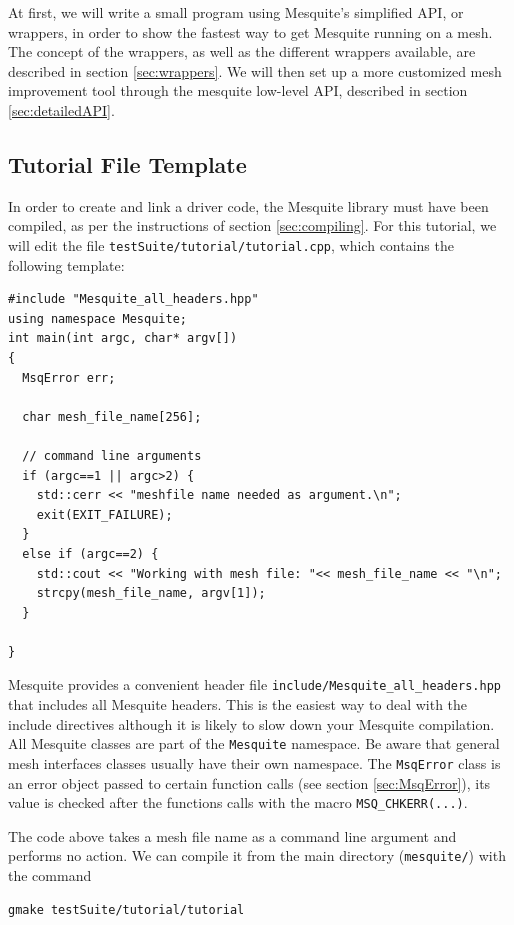 \documentclass[letter]{report}
\begin{document}
At first, we will write a small program using Mesquite's simplified API, or wrappers, in order to show the
fastest way to get Mesquite running on a mesh. The concept of the wrappers, as well as the different
wrappers available, are described in section \ref{sec:wrappers}. We will then set up a more customized mesh
improvement tool through the mesquite low-level API, described in section \ref{sec:detailedAPI}.

\subsection{Tutorial File Template}
\label{sec:tutfile}

In order to create and link a driver code, the Mesquite library must have been compiled, as per the
instructions of section \ref{sec:compiling}. For this tutorial, we will edit the file
\texttt{testSuite/tutorial/tutorial.cpp}, which contains the following template:
\begin{verbatim}
#include "Mesquite_all_headers.hpp"
using namespace Mesquite;
int main(int argc, char* argv[])
{
  MsqError err;
  
  char mesh_file_name[256];
  
  // command line arguments
  if (argc==1 || argc>2) {
    std::cerr << "meshfile name needed as argument.\n";
    exit(EXIT_FAILURE);
  }
  else if (argc==2) {
    std::cout << "Working with mesh file: "<< mesh_file_name << "\n";
    strcpy(mesh_file_name, argv[1]);
  } 
  
}
\end{verbatim}
Mesquite provides a convenient header file \texttt{include/Mesquite\_all\_headers.hpp} that includes
all Mesquite headers. This is the easiest way to deal with the include directives although it is likely to slow
down your Mesquite compilation.
All Mesquite classes are part of the \texttt{Mesquite} namespace. Be aware that general mesh interfaces
classes usually have their own namespace. The \texttt{MsqError} class is an error object passed to 
certain function calls (see section \ref{sec:MsqError}), its value is checked after the functions calls with
the macro \texttt{MSQ\_CHKERR(...)}.

The code above takes a mesh file name as a command line argument and performs no action. 
We can compile it from the main directory
(\texttt{mesquite/}) with the command 
\begin{verbatim}
gmake testSuite/tutorial/tutorial
\end{verbatim}
\end{document}
